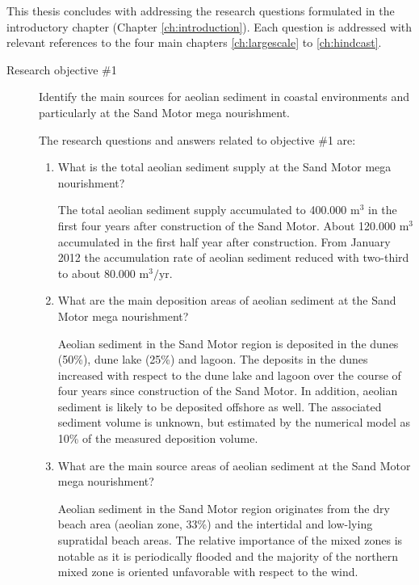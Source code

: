 This thesis concludes with addressing the research questions
formulated in the introductory chapter (Chapter
\ref{ch:introduction}). Each question is addressed with relevant
references to the four main chapters \ref{ch:largescale} to
\ref{ch:hindcast}.

\begin{description}
\item[Research objective \#1] Identify the main sources for aeolian
  sediment in coastal environments and particularly at the Sand Motor
  mega nourishment.

  \medskip

  The research questions and answers related to objective \#1 are:

  \begin{enumerate}[{1.}1]
  \item What is the total aeolian sediment supply at the Sand Motor
    mega nourishment?

    The total aeolian sediment supply accumulated to 400.000
    $\mathrm{m^3}$ in the first four years after construction of the
    Sand Motor. About 120.000 $\mathrm{m^3}$ accumulated in
    the first half year after construction. From January 2012 the
    accumulation rate of aeolian sediment reduced with two-third to
    about 80.000 $\mathrm{m^3/yr}$.

  \item What are the main deposition areas of aeolian sediment at the
    Sand Motor mega nourishment?

    Aeolian sediment in the Sand Motor region is deposited in the
    dunes (50\%), dune lake (25\%) and lagoon. The
    deposits in the dunes increased with respect to the dune lake and
    lagoon over the course of four years since construction of the
    Sand Motor. In addition, aeolian sediment is likely to be
    deposited offshore as well. The associated sediment volume is
    unknown, but estimated by the numerical model as 10\% of the
    measured deposition volume.

  \item What are the main source areas of aeolian sediment at the Sand
    Motor mega nourishment?

    Aeolian sediment in the Sand Motor region originates from the dry
    beach area (aeolian zone, 33\%) and the intertidal and low-lying
    supratidal beach areas. The
    relative importance of the mixed zones is notable as it is
    periodically flooded and the majority of the northern mixed zone
    is oriented unfavorable with respect to the wind.
  

\end{enumerate}
\end{description}
